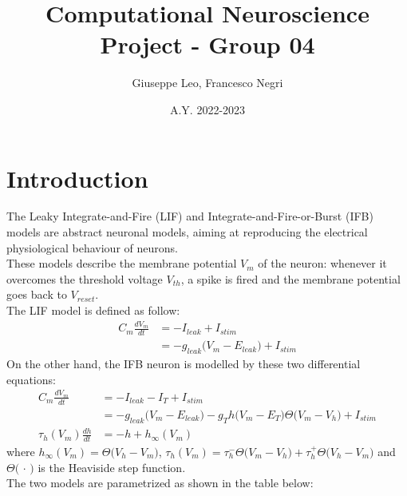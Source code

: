 \documentclass[10.5pt]{article}
\title{Computational Neuroscience Project - Group 04}
\author{Giuseppe Leo, Francesco Negri}
\date{A.Y. 2022-2023}
\begin{document}
\maketitle

\section*{Introduction}
The Leaky Integrate-and-Fire (LIF) and Integrate-and-Fire-or-Burst (IFB) models
are abstract neuronal models, aiming at reproducing the electrical physiological
behaviour of neurons.\\
These models describe the membrane potential \(V_{m}\) of the neuron:
whenever it overcomes the threshold voltage
\(V_{th}\), a spike is fired and the membrane potential goes back to \(V_{reset}\).\\
The LIF model is defined as follow:
\begin{align*}
    C_{m}\frac{dV_{m}}{dt} & =-I_{leak}+I_{stim}                           \\
                           & =-g_{leak}\bigl(V_{m}-E_{leak}\bigr)+I_{stim}
\end{align*}
On the other hand, the IFB neuron is modelled by these two differential equations:
\begin{align*}
    C_{m}\frac{dV_{m}}{dt}       & =-I_{leak}-I_{T}+I_{stim}                                                                                \\
                                 & =-g_{leak}\bigl(V_{m}-E_{leak}\bigr)-g_{T}h\bigl(V_{m}-E_{T}\bigr)\Theta\bigl(V_{m}-V_{h}\bigr)+I_{stim} \\
    \tau_{h}(V_{m})\frac{dh}{dt} & =-h+h_{\infty}(V_{m})
\end{align*}
where \(h_{\infty}(V_{m})=\Theta\bigl(V_{h}-V_{m}\bigr)\),
\(\tau_{h}(V_{m})=\tau_{h}^{-}\Theta\bigl(V_{m}-V_{h}\bigr)+\tau_{h}^{+}\Theta\bigl(V_{h}-V_{m}\bigr)\) and
\(\Theta\bigl(\,\cdot\,\bigr)\) is the Heaviside step function.\\
The two models are parametrized as shown in the table below:
\end{document}
